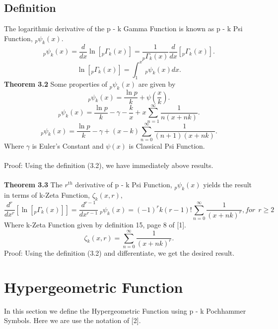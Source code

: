 \documentclass[11pt,a4paper]{article}
\numberwithin{equation}{section}
\begin{document}
\subsection{Definition}
The logarithmic derivative of the p - k Gamma Function is known as p - k Psi Function, $ _{p}\psi_{k}(x).$
\begin{equation}
   _{p}\psi_{k}(x)=\frac{d}{dx} \ln [_{p}\Gamma _{k}(x)]=\frac{1}{_{p}\Gamma _{k}(x)}\frac{d}{dx}[_{p}\Gamma _{k}(x)].
\end{equation} 
\begin{equation}
\ln [_{p}\Gamma _{k}(x)]=\int_{1}^{x}\:_{p}\psi_{k}(x)dx.
\end{equation}
\textbf{Theorem 3.2} Some properties of $ _{p}\psi_{k}(x) $ are given by
\begin{equation}
  _{p}\psi_{k}(x)=\frac{\ln p}{k}+\psi(\frac{x}{k}).
  \end{equation}  
\begin{equation}
  _{p}\psi_{k}(x)=\frac{\ln p}{k}-\gamma- \frac{k}{x}+ x\sum_{n=1}^{\infty}\frac{1}{n(x+nk)}.
  \end{equation}   
  \begin{equation}
  _{p}\psi_{k}(x)=\frac{\ln p}{k}-\gamma + (x-k)\sum_{n=0}^{\infty}\frac{1}{(n+1)(x+nk)}.
  \end{equation} 
  Where $ \gamma  $ is Euler's Constant and $ \psi(x) $ is Classical Psi Function.\\\\
 Proof: Using the definition (3.2), we have immediately above results.\\\\
 \textbf{Theorem 3.3} The $ r^{th} $ derivative of p - k Psi Function, $ _{p}\psi_{k}(x)$ yields the result in terms of k-Zeta Function, $ \zeta_{k}(x,r), $
 \begin{equation}
 \frac{d^{r}}{dx^{r}}[\ln [_{p}\Gamma _{k}(x)]]=\frac{d^{r-1}}{dx^{r-1}}\:_{p}\psi_{k}(x)=(-1)^{r}k(r-1)!\sum_{n=0}^{\infty}\frac{1}{(x+nk)^{r}}, for \: \:r\geq 2
 \end{equation}
 Where k-Zeta Function given by definition 15, page 8 of [1]. 
 \[ \zeta_{k}(x,r)=\sum_{n=0}^{\infty}\frac{1}{(x+nk)^{r}}.\]
 Proof: Using the definition (3.2) and differentiate, we get the desired result.
\section{Hypergeometric Function}
In this section we define the Hypergeometric Function using p - k Pochhammer Symbols. Here we are use the notation of  [2].
\end{document}
